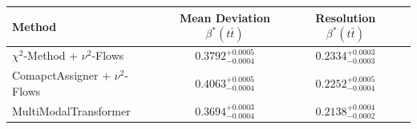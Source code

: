     \begin{tabular}{lccc}
        \toprule
        Method & Mean Deviation $\beta^*(t\bar{t})$ & Resolution $\beta^*(t\bar{t})$ \\
        \midrule
        $\chi^2$-Method + $\nu^2$-Flows & $0.3792^{+0.0005}_{-0.0004}$ & $0.2334^{+0.0003}_{-0.0003}$ \\
        ComapctAssigner + $\nu^2$-Flows & $0.4063^{+0.0005}_{-0.0004}$ & $0.2252^{+0.0005}_{-0.0004}$ \\
        MultiModalTransformer & $0.3694^{+0.0003}_{-0.0004}$ & $0.2138^{+0.0004}_{-0.0002}$ \\
        \bottomrule
    \end{tabular}